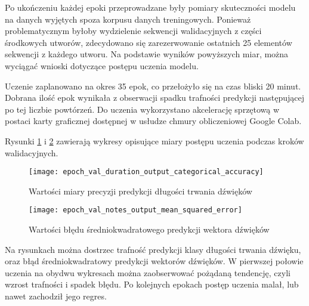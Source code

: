 {{        Po ukończeniu każdej epoki przeprowadzane były pomiary skuteczności modelu na danych wyjętych spoza korpusu 
        danych treningowych. Ponieważ problematycznym byłoby wydzielenie sekwencji walidacyjnych z\,\,części środkowych
        utworów, zdecydowano się zarezerwowanie ostatnich 25 elementów sekwencji z\,\,każdego utworu.
        Na podstawie wyników powyższych miar, można wyciągać wnioski dotyczące postępu uczenia modelu.

        Uczenie zaplanowano na okres 35 epok, co przełożyło się na czas bliski 20 minut. Dobrana ilość epok wynikała 
        z\,\,obserwacji spadku trafności predykcji następującej po tej liczbie powtórzeń. Do uczenia wykorzystano
        akcelerację sprzętową w\,\,postaci karty graficznej dostępnej w\,\,usłudze chmury obliczeniowej Google Colab.

        Rysunki \ref{epoch_val_duration_output_categorical_accuracy} i\,\,\ref{epoch_val_notes_output_mean_squared_error} zawierają wykresy opisujące miary postępu uczenia podczas kroków walidacyjnych.

        \begin{figure}[H]
            \centering
            \texttt{[image: epoch\_val\_duration\_output\_categorical\_accuracy]}
            \caption{Wartości miary precyzji predykcji długości trwania dźwięków}
            \label{epoch_val_duration_output_categorical_accuracy}
        \end{figure}

        \begin{figure}[H]
            \centering
            \texttt{[image: epoch\_val\_notes\_output\_mean\_squared\_error]}
            \caption{Wartości błędu średniokwadratowego predykcji wektora dźwięków}
            \label{epoch_val_notes_output_mean_squared_error}
        \end{figure}

        Na rysunkach można dostrzec trafność predykcji klasy długości trwania dźwięku, oraz błąd średniokwadratowy
        predykcji wektorów dźwięków. W\,\,pierwszej połowie uczenia na obydwu wykresach można zaobserwować pożądaną tendencję,
        czyli wzrost trafności i\,\,spadek błędu. Po kolejnych epokach postęp uczenia malał, lub nawet zachodził jego regres.
    }
}